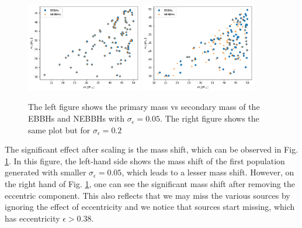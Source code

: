 \documentclass[twocolumn,prd,nofootinbib]{revtex4}
\begin{document}
\begin{figure}

\includegraphics[width=0.45\textwidth]{paper/figures/pop2d_0.05.png}
\includegraphics[width=0.45\textwidth]{paper/figures/pop2d_0.2.png}
\caption{\label{fig:pop2d_0.05_0.2} The left figure shows the primary mass vs secondary mass of the EBBHs and NEBBHs with $\sigma_\epsilon =0.05$. The right figure shows the same plot but for $\sigma_\epsilon=0.2$} 

\end{figure}




   


The significant effect after scaling is the mass shift, which can be observed in Fig. \ref{fig:pop2d_0.05_0.2}. In this figure, the left-hand side shows the mass shift of the first population generated with smaller $\sigma_\epsilon =0.05$, which leads to a lesser mass shift. However, on the right hand of Fig. \ref{fig:pop2d_0.05_0.2}, one can see the significant mass shift after removing the eccentric component.  This also reflects that we may miss the various sources by ignoring the effect of eccentricity and we notice that sources start missing, which has eccentricity $\epsilon>0.38$.
\end{document}
